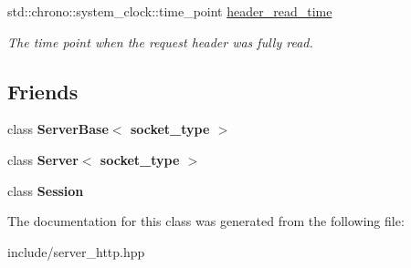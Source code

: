 \begin{DoxyCompactItemize}
\item 
std\+::chrono\+::system\+\_\+clock\+::time\+\_\+point \hyperlink{classSimpleWeb_1_1ServerBase_1_1Request_afca51d73b0130bcb6cf5455807c59b4d}{header\+\_\+read\+\_\+time}\hypertarget{classSimpleWeb_1_1ServerBase_1_1Request_afca51d73b0130bcb6cf5455807c59b4d}{}\label{classSimpleWeb_1_1ServerBase_1_1Request_afca51d73b0130bcb6cf5455807c59b4d}

\begin{DoxyCompactList}\small\item\em The time point when the request header was fully read. \end{DoxyCompactList}\end{DoxyCompactItemize}
\subsection*{Friends}
\begin{DoxyCompactItemize}
\item 
class {\bfseries Server\+Base$<$ socket\+\_\+type $>$}\hypertarget{classSimpleWeb_1_1ServerBase_1_1Request_a01d54a7e16ca437c98ec571deca98dfc}{}\label{classSimpleWeb_1_1ServerBase_1_1Request_a01d54a7e16ca437c98ec571deca98dfc}

\item 
class {\bfseries Server$<$ socket\+\_\+type $>$}\hypertarget{classSimpleWeb_1_1ServerBase_1_1Request_a3f155064c0074d68a408aa3193ca1666}{}\label{classSimpleWeb_1_1ServerBase_1_1Request_a3f155064c0074d68a408aa3193ca1666}

\item 
class {\bfseries Session}\hypertarget{classSimpleWeb_1_1ServerBase_1_1Request_afbdd63a566878ce30072e785ca7e7740}{}\label{classSimpleWeb_1_1ServerBase_1_1Request_afbdd63a566878ce30072e785ca7e7740}

\end{DoxyCompactItemize}


The documentation for this class was generated from the following file\+:\begin{DoxyCompactItemize}
\item 
include/server\+\_\+http.\+hpp\end{DoxyCompactItemize}
